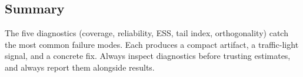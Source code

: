 \subsection{Summary}

The five diagnostics (coverage, reliability, ESS, tail index, orthogonality) catch the most common failure modes. Each produces a compact artifact, a traffic-light signal, and a concrete fix. Always inspect diagnostics before trusting estimates, and always report them alongside results.

